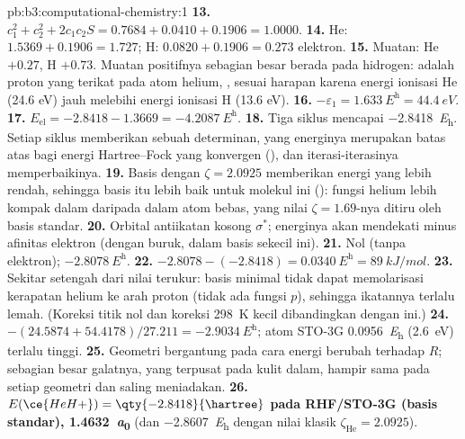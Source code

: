 \begin{solution}{pb:b3:computational-chemistry:1}
\textbf{13.} $c_1^2 + c_2^2 + 2c_1c_2S = 0.7684 + 0.0410 + 0.1906 = 1.0000$.
\textbf{14.} He: $1.5369 + 0.1906 = 1.727$; H: $0.0820 + 0.1906 = 0.273$
elektron.
\textbf{15.} Muatan: He $+0.27$, H $+0.73$. Muatan positifnya sebagian besar
berada pada hidrogen:  adalah proton yang terikat pada atom helium,
, sesuai harapan karena energi ionisasi He (24.6 eV) jauh melebihi
energi ionisasi H (13.6 eV).
\textbf{16.} $-\varepsilon_1 = \qty{1.633}{\hartree} = \qty{44.4}{eV}$.
\textbf{17.} $E_{\mathrm{el}} = -2.8418 - 1.3669 = \qty{-4.2087}{\hartree}$.
\textbf{18.} Tiga siklus mencapai \qty{-2.8418}{\hartree}. Setiap siklus
memberikan sebuah determinan, yang energinya merupakan batas atas bagi energi
Hartree--Fock yang konvergen (), dan iterasi-iterasinya
memperbaikinya.
\textbf{19.} Basis dengan $\zeta = 2.0925$ memberikan energi yang lebih rendah,
sehingga basis itu lebih baik untuk molekul ini (): fungsi
helium lebih kompak dalam  daripada dalam atom bebas, yang nilai
$\zeta = 1.69$-nya ditiru oleh basis standar.
\textbf{20.} Orbital antiikatan kosong $\sigma^*$; energinya akan mendekati
minus afinitas elektron  (dengan buruk, dalam basis sekecil ini).
\textbf{21.} Nol (tanpa elektron); $\qty{-2.8078}{\hartree}$.
\textbf{22.} $-2.8078 - (-2.8418) = \qty{0.0340}{\hartree} = \qty{89}{kJ/mol}$.
\textbf{23.} Sekitar setengah dari nilai terukur: basis minimal tidak dapat
memolarisasi kerapatan helium ke arah proton (tidak ada fungsi $p$), sehingga
ikatannya terlalu lemah. (Koreksi titik nol dan koreksi \qty{298}{K} kecil
dibandingkan dengan ini.)
\textbf{24.} $-(24.5874 + 54.4178)/27.211 = \qty{-2.9034}{\hartree}$; atom STO-3G
\qty{0.0956}{\hartree} (\qty{2.6}{eV}) terlalu tinggi.
\textbf{25.} Geometri bergantung pada cara energi berubah terhadap $R$;
sebagian besar galatnya, yang terpusat pada kulit dalam, hampir sama pada
setiap geometri dan saling meniadakan.
\textbf{26.} \textbf{$E(\ce{HeH+}) = \qty{-2.8418}{\hartree}$ pada RHF/STO-3G
(basis standar), \qty{1.4632}{\bohr}} (dan \qty{-2.8607}{\hartree} dengan nilai
klasik $\zeta_{\mathrm{He}} = 2.0925$).
\end{solution}

